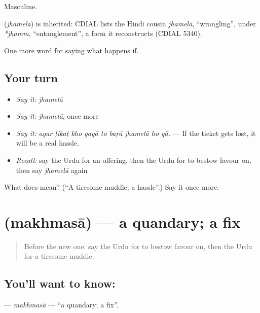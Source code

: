 Masculine.

\begin{cousinweb}
\textbf{} (\emph{jhamelā}) is inherited: CDIAL lists the Hindi cousin \emph{jhamelā}, \textquotedblleft{}wrangling\textquotedblright{}, under \emph{*jhamm}, \textquotedblleft{}entanglement\textquotedblright{}, a form it reconstructs (CDIAL 5340).
\end{cousinweb}

\begin{grammarlens}[title={What you've built}]
One more word for saying what happens if.
\end{grammarlens}

\subsection*{Your turn}
\begin{itemize}
\raggedright
  \item \emph{Say it:} \emph{jhamelā}
  \item \emph{Say it:} \emph{jhamelā}, once more
  \item \emph{Say it:} \emph{agar ṭikaṭ kho gayā to baṛā jhamelā ho gā.} — If the ticket gets lost, it will be a real hassle.
  \item \emph{Recall:} say the Urdu for an offering, then the Urdu for to bestow favour on, then say \emph{jhamelā} again
\end{itemize}

\begin{tcolorbox}[breakable,colback=teal!4,colframe=teal!35!black,title={Before you move on}]
What does  mean? (\textquotedblleft{}A tiresome muddle; a hassle\textquotedblright{}.) Say it once more.
\end{tcolorbox}
\section[\texorpdfstring{\ur{مخمصہ} (makhmasā)}{مخمصہ (makhmasā)}]{ (makhmasā) — a quandary; a fix}

\label{lesson:UR-C529-makhmasa}



\begin{quote}
Before the new one: say the Urdu for to bestow favour on, then the Urdu for a tiresome muddle.
\end{quote}

\subsection*{You'll want to know: }
\textbf{} — \emph{makhmasā} — \textquotedblleft{}a quandary; a fix\textquotedblright{}.

